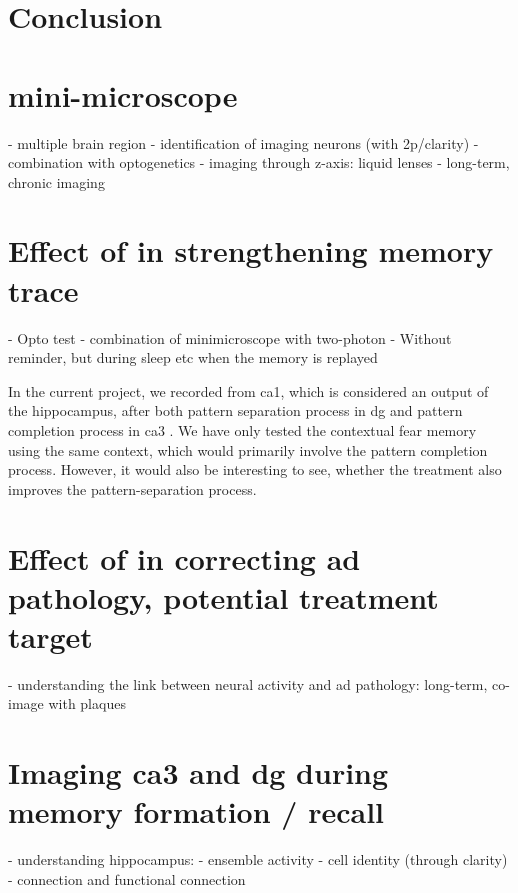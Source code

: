 \section{Conclusion}

\section{mini-microscope}
- multiple brain region
- identification of imaging neurons (with 2p/clarity)
- combination with optogenetics
- imaging through z-axis: liquid lenses
- long-term, chronic imaging

\section{Effect of \tglu in strengthening memory trace}
- Opto test - combination of minimicroscope with two-photon
- Without reminder, but during sleep etc when the memory is replayed

In the current project, we recorded from \gls{ca1}, which is considered an output of the hippocampus, after both pattern separation process in \gls{dg} and pattern completion process in \gls{ca3} . We have only tested the contextual fear memory using the same context, which would primarily involve the pattern completion process. However, it would also be interesting to see, whether the \tglu treatment also improves the pattern-separation process. \citet{migues16} 

\section{Effect of \tglu in correcting \gls{ad} pathology, potential treatment target}
- understanding the link between neural activity and ad pathology:
    long-term, co-image with plaques

\section{Imaging \gls{ca3} and \gls{dg} during memory formation / recall}
- understanding hippocampus:
    - ensemble activity
    - cell identity (through clarity)
    - connection and functional connection







